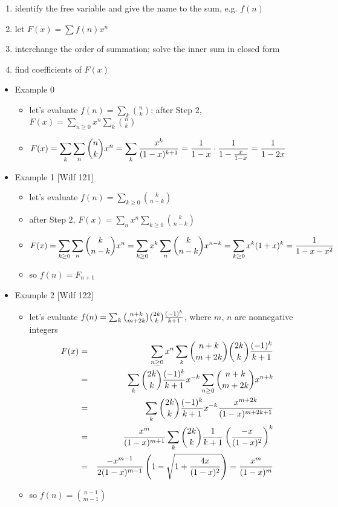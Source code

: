 \documentclass[10pt, a4paper]{article}
\begin{document}
\begin{enumerate}
    \item identify the free variable and give the name to the sum, e.g. $f(n)$
    \item let $F(x) = \sum f(n)x^n$
    \item interchange the order of summation; solve the inner sum in closed form
    \item find coefficients of $F(x)$
\end{enumerate}

\begin{itemize}
\item
Example 0
\begin{itemize}
    \item let's evaluate $f(n) = \sum_k {n\choose k}$; after Step 2, $F(x) = \sum_{n\ge 0} x^n \sum_k {n\choose k}$
    \item $\displaystyle F(x) = \sum_k \sum_n {n\choose k}x^n = \sum_k {x^k\over (1-x)^{k+1}}={1\over 1-x}\cdot {1\over 1-{x\over 1-x}}={1\over 1-2x}$
\end{itemize}

\item
Example 1 [Wilf 121]
\begin{itemize}
    \item let's evaluate $f(n) = \sum_{k\ge 0} {k\choose n-k}$
    \item after Step 2, $F(x) = \sum_n x^n \sum_{k\ge 0} {k\choose n-k}$
    \item $\displaystyle F(x) = \sum_{k\ge 0} \sum_n {k\choose n-k}x^n = \sum_{k\ge 0}x^k\sum_n {k\choose n-k}x^{n-k} = \sum_{k\ge 0}x^k (1+x)^k = {1\over 1-x-x^2}$
    \item so $f(n) = F_{n+1}$
\end{itemize}

\item
Example 2 [Wilf 122]
\begin{itemize}
    \item let's evaluate $f(n) = \sum_{k} {n+k\choose m+2k}{2k\choose k}{(-1)^k\over k+1}$, where $m$, $n$ are nonnegative integers
        \begin{eqnarray*}
        F(x) &=& \sum_{n\ge 0} x^n \sum_{k} {n+k\choose m+2k}{2k\choose k}{(-1)^k\over k+1} \\
             &=& \sum_k {2k\choose k}{(-1)^k\over k+1}x^{-k}\sum_{n\ge 0}{n+k\choose m+2k}x^{n+k}\\
             &=& \sum_k {2k\choose k}{(-1)^k\over k+1}x^{-k}{x^{m+2k}\over (1-x)^{m+2k+1}}\\
             &=& {x^m\over (1-x)^{m+1}}\sum_k {2k\choose k}{1\over k+1}\left({-x\over (1-x)^2}\right)^k \\
             &=& {-x^{m-1}\over 2(1-x)^{m-1}}\left(1-\sqrt{1+{4x\over (1-x)^2}}\right) = {x^m\over (1-x)^m}
        \end{eqnarray*}
    \item so $f(n) = {n-1\choose m-1}$
\end{itemize}


\end{itemize}
\end{document}
